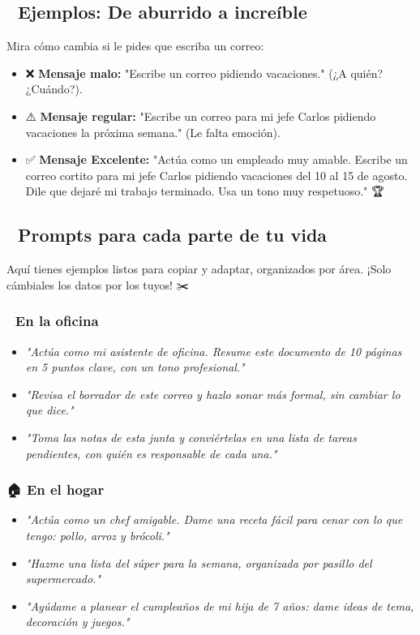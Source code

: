 \documentclass[12pt]{article}
\begin{document}
\subsection{🌟 Ejemplos: De aburrido a increíble}
Mira cómo cambia si le pides que escriba un correo:
\begin{itemize}
    \item ❌ \textbf{Mensaje malo:} "Escribe un correo pidiendo vacaciones." (¿A quién? ¿Cuándo?).
    \item ⚠️ \textbf{Mensaje regular:} "Escribe un correo para mi jefe Carlos pidiendo vacaciones la próxima semana." (Le falta emoción).
    \item ✅ \textbf{Mensaje Excelente:} "Actúa como un empleado muy amable. Escribe un correo cortito para mi jefe Carlos pidiendo vacaciones del 10 al 15 de agosto. Dile que dejaré mi trabajo terminado. Usa un tono muy respetuoso." 🏆
\end{itemize}

\subsection{🧭 Prompts para cada parte de tu vida}
Aquí tienes ejemplos listos para copiar y adaptar, organizados por área. ¡Solo cámbiales los datos por los tuyos! ✂️

\subsubsection{🏢 En la oficina}
\begin{itemize}
    \item \textit{"Actúa como mi asistente de oficina. Resume este documento de 10 páginas en 5 puntos clave, con un tono profesional."}
    \item \textit{"Revisa el borrador de este correo y hazlo sonar más formal, sin cambiar lo que dice."}
    \item \textit{"Toma las notas de esta junta y conviértelas en una lista de tareas pendientes, con quién es responsable de cada una."}
\end{itemize}

\subsubsection{🏠 En el hogar}
\begin{itemize}
    \item \textit{"Actúa como un chef amigable. Dame una receta fácil para cenar con lo que tengo: pollo, arroz y brócoli."}
    \item \textit{"Hazme una lista del súper para la semana, organizada por pasillo del supermercado."}
    \item \textit{"Ayúdame a planear el cumpleaños de mi hija de 7 años: dame ideas de tema, decoración y juegos."}
\end{itemize}
\end{document}
